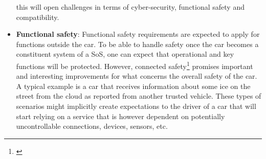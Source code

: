 \begin{itemize}
this will open challenges in terms of cyber-security, functional safety and compatibility. 
\item {\bf Functional safety}: Functional safety requirements are expected to apply for functions outside the car. To be able to handle safety once the car becomes a constituent system of a SoS, one can expect that operational and key functions will be protected. However, connected safety\footnote{ \url{}} promises important and interesting improvements for what concerns the overall safety of the car. A typical example is a car that receives information about some ice on the street from the cloud as reported from another trusted vehicle. These types of scenarios might implicitly create expectations to the driver of a car that will start relying on a service that is however dependent on potentially uncontrollable connections, devices, sensors, etc. 
\end{itemize}



%
%

